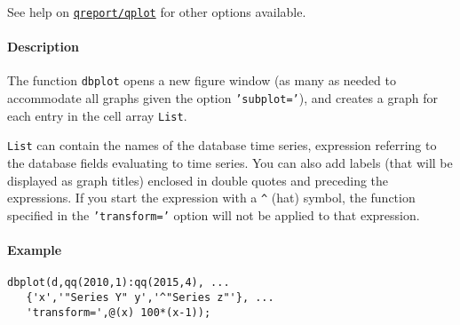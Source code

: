 See help on \href{qreport/qplot}{\texttt{qreport/qplot}} for other
options available.

\paragraph{Description}\label{description}

The function \texttt{dbplot} opens a new figure window (as many as
needed to accommodate all graphs given the option \texttt{'subplot='}),
and creates a graph for each entry in the cell array \texttt{List}.

\texttt{List} can contain the names of the database time series,
expression referring to the database fields evaluating to time series.
You can also add labels (that will be displayed as graph titles)
enclosed in double quotes and preceding the expressions. If you start
the expression with a \texttt{\^{}} (hat) symbol, the function specified
in the \texttt{'transform='} option will not be applied to that
expression.

\paragraph{Example}\label{example}

\begin{verbatim}
dbplot(d,qq(2010,1):qq(2015,4), ...
   {'x','"Series Y" y','^"Series z"'}, ...
   'transform=',@(x) 100*(x-1));
\end{verbatim}


